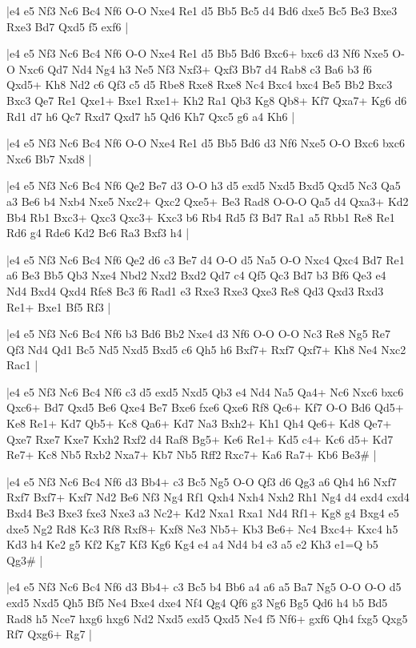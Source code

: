 \whitename{}
\blackname{}
\makegametitle
|e4 e5 Nf3 Nc6 Bc4 Nf6 O-O Nxe4 Re1 d5 Bb5 Bc5 d4 Bd6 dxe5 Bc5 Be3 Bxe3 Rxe3 Bd7 Qxd5 f5 exf6  |

\whitename{}
\blackname{}
\makegametitle
|e4 e5 Nf3 Nc6 Bc4 Nf6 O-O Nxe4 Re1 d5 Bb5 Bd6 Bxc6+ bxc6 d3 Nf6 Nxe5 O-O Nxc6 Qd7 Nd4 Ng4 h3 Ne5 Nf3 Nxf3+ Qxf3 Bb7 d4 Rab8 c3 Ba6 b3 f6 Qxd5+ Kh8 Nd2 c6 Qf3 c5 d5 Rbe8 Rxe8 Rxe8 Nc4 Bxc4 bxc4 Be5 Bb2 Bxc3 Bxc3 Qe7 Re1 Qxe1+ Bxe1 Rxe1+ Kh2 Ra1 Qb3 Kg8 Qb8+ Kf7 Qxa7+ Kg6 d6 Rd1 d7 h6 Qc7 Rxd7 Qxd7 h5 Qd6 Kh7 Qxc5 g6 a4 Kh6  |

\whitename{}
\blackname{}
\makegametitle
|e4 e5 Nf3 Nc6 Bc4 Nf6 O-O Nxe4 Re1 d5 Bb5 Bd6 d3 Nf6 Nxe5 O-O Bxc6 bxc6 Nxc6 Bb7 Nxd8  |

\whitename{}
\blackname{}
\makegametitle
|e4 e5 Nf3 Nc6 Bc4 Nf6 Qe2 Be7 d3 O-O h3 d5 exd5 Nxd5 Bxd5 Qxd5 Nc3 Qa5 a3 Be6 b4 Nxb4 Nxe5 Nxc2+ Qxc2 Qxe5+ Be3 Rad8 O-O-O Qa5 d4 Qxa3+ Kd2 Bb4 Rb1 Bxc3+ Qxc3 Qxc3+ Kxc3 b6 Rb4 Rd5 f3 Bd7 Ra1 a5 Rbb1 Re8 Re1 Rd6 g4 Rde6 Kd2 Bc6 Ra3 Bxf3 h4  |

\whitename{}
\blackname{}
\makegametitle
|e4 e5 Nf3 Nc6 Bc4 Nf6 Qe2 d6 c3 Be7 d4 O-O d5 Na5 O-O Nxc4 Qxc4 Bd7 Re1 a6 Be3 Bb5 Qb3 Nxe4 Nbd2 Nxd2 Bxd2 Qd7 c4 Qf5 Qc3 Bd7 b3 Bf6 Qe3 e4 Nd4 Bxd4 Qxd4 Rfe8 Bc3 f6 Rad1 e3 Rxe3 Rxe3 Qxe3 Re8 Qd3 Qxd3 Rxd3 Re1+ Bxe1 Bf5 Rf3  |

\whitename{}
\blackname{}
\makegametitle
|e4 e5 Nf3 Nc6 Bc4 Nf6 b3 Bd6 Bb2 Nxe4 d3 Nf6 O-O O-O Nc3 Re8 Ng5 Re7 Qf3 Nd4 Qd1 Bc5 Nd5 Nxd5 Bxd5 c6 Qh5 h6 Bxf7+ Rxf7 Qxf7+ Kh8 Ne4 Nxc2 Rac1  |

\whitename{}
\blackname{}
\makegametitle
|e4 e5 Nf3 Nc6 Bc4 Nf6 c3 d5 exd5 Nxd5 Qb3 e4 Nd4 Na5 Qa4+ Nc6 Nxc6 bxc6 Qxc6+ Bd7 Qxd5 Be6 Qxe4 Be7 Bxe6 fxe6 Qxe6 Rf8 Qc6+ Kf7 O-O Bd6 Qd5+ Ke8 Re1+ Kd7 Qb5+ Kc8 Qa6+ Kd7 Na3 Bxh2+ Kh1 Qh4 Qe6+ Kd8 Qe7+ Qxe7 Rxe7 Kxe7 Kxh2 Rxf2 d4 Raf8 Bg5+ Ke6 Re1+ Kd5 c4+ Kc6 d5+ Kd7 Re7+ Kc8 Nb5 Rxb2 Nxa7+ Kb7 Nb5 Rff2 Rxc7+ Ka6 Ra7+ Kb6 Be3\#  |

\whitename{}
\blackname{}
\makegametitle
|e4 e5 Nf3 Nc6 Bc4 Nf6 d3 Bb4+ c3 Bc5 Ng5 O-O Qf3 d6 Qg3 a6 Qh4 h6 Nxf7 Rxf7 Bxf7+ Kxf7 Nd2 Be6 Nf3 Ng4 Rf1 Qxh4 Nxh4 Nxh2 Rh1 Ng4 d4 exd4 cxd4 Bxd4 Be3 Bxe3 fxe3 Nxe3 a3 Nc2+ Kd2 Nxa1 Rxa1 Nd4 Rf1+ Kg8 g4 Bxg4 e5 dxe5 Ng2 Rd8 Kc3 Rf8 Rxf8+ Kxf8 Ne3 Nb5+ Kb3 Be6+ Nc4 Bxc4+ Kxc4 h5 Kd3 h4 Ke2 g5 Kf2 Kg7 Kf3 Kg6 Kg4 e4 a4 Nd4 b4 e3 a5 e2 Kh3 e1=Q b5 Qg3\#  |

\whitename{}
\blackname{}
\makegametitle
|e4 e5 Nf3 Nc6 Bc4 Nf6 d3 Bb4+ c3 Bc5 b4 Bb6 a4 a6 a5 Ba7 Ng5 O-O O-O d5 exd5 Nxd5 Qh5 Bf5 Ne4 Bxe4 dxe4 Nf4 Qg4 Qf6 g3 Ng6 Bg5 Qd6 h4 b5 Bd5 Rad8 h5 Nce7 hxg6 hxg6 Nd2 Nxd5 exd5 Qxd5 Ne4 f5 Nf6+ gxf6 Qh4 fxg5 Qxg5 Rf7 Qxg6+ Rg7  |


